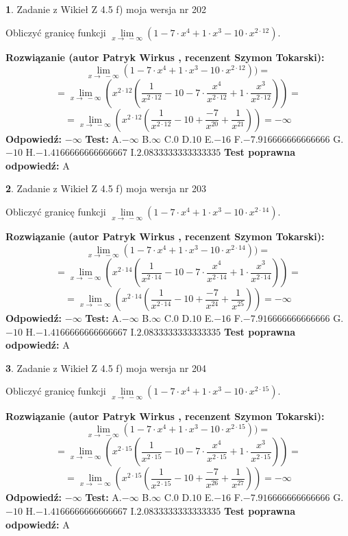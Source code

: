 \documentclass[12pt, a4paper]{article}
\theoremstyle{definition} %
\newtheorem{zad}{}
\newcommand{\zadStart}[1]{\begin{zad}#1\newline}
\newcommand{\zadStop}{\end{zad}}
\newcommand{\rozwStart}[2]{\noindent \textbf{Rozwiązanie (autor #1 , recenzent #2): }\newline}
\newcommand{\rozwStop}{\newline}
\newcommand{\odpStart}{\noindent \textbf{Odpowiedź:}\newline}
\newcommand{\odpStop}{\newline}
\newcommand{\testStart}{\noindent \textbf{Test:}\newline}
\newcommand{\testStop}{\newline}
\newcommand{\kluczStart}{\noindent \textbf{Test poprawna odpowiedź:}\newline}
\newcommand{\kluczStop}{\newline}
\begin{document}
\zadStart{Zadanie z Wikieł Z 4.5 f) moja wersja nr 202}


Obliczyć granicę funkcji  $\lim\limits_{x\to\ -\infty}(1 - 7 \cdot x^{4}+1 \cdot x^{3}- 10 \cdot x^{2\cdot12})$.
\zadStop
\rozwStart{Patryk Wirkus}{Szymon Tokarski}
$$\lim\limits_{x\to\ -\infty}(1 - 7 \cdot x^{4}+1 \cdot x^{3}- 10 \cdot x^{2\cdot12}))=$$
$$=\lim\limits_{x\to\ -\infty}(x^{2\cdot12}(\frac{1}{x^{2\cdot12}}-10 -7 \cdot \frac{x^{4}}{x^{2\cdot12}}+1 \cdot \frac{x^{3}}{x^{2\cdot12}}))=$$
$$=\lim\limits_{x\to\ -\infty}(x^{2\cdot12}(\frac{1}{x^{2\cdot12}}-10 + \frac{-7}{x^{20}}+ \frac{1}{x^{21}}))=-\infty$$
\rozwStop
\odpStart
$-\infty$
\odpStop
\testStart
A.$-\infty$ B.$\infty$ C.$0$ D.$10$ E.$-16$
F.$-7.916666666666666$ G.$-10$
H.$-1.4166666666666667$
I.$2.0833333333333335$
\testStop
\kluczStart
A
\kluczStop



\zadStart{Zadanie z Wikieł Z 4.5 f) moja wersja nr 203}


Obliczyć granicę funkcji  $\lim\limits_{x\to\ -\infty}(1 - 7 \cdot x^{4}+1 \cdot x^{3}- 10 \cdot x^{2\cdot14})$.
\zadStop
\rozwStart{Patryk Wirkus}{Szymon Tokarski}
$$\lim\limits_{x\to\ -\infty}(1 - 7 \cdot x^{4}+1 \cdot x^{3}- 10 \cdot x^{2\cdot14}))=$$
$$=\lim\limits_{x\to\ -\infty}(x^{2\cdot14}(\frac{1}{x^{2\cdot14}}-10 -7 \cdot \frac{x^{4}}{x^{2\cdot14}}+1 \cdot \frac{x^{3}}{x^{2\cdot14}}))=$$
$$=\lim\limits_{x\to\ -\infty}(x^{2\cdot14}(\frac{1}{x^{2\cdot14}}-10 + \frac{-7}{x^{24}}+ \frac{1}{x^{25}}))=-\infty$$
\rozwStop
\odpStart
$-\infty$
\odpStop
\testStart
A.$-\infty$ B.$\infty$ C.$0$ D.$10$ E.$-16$
F.$-7.916666666666666$ G.$-10$
H.$-1.4166666666666667$
I.$2.0833333333333335$
\testStop
\kluczStart
A
\kluczStop



\zadStart{Zadanie z Wikieł Z 4.5 f) moja wersja nr 204}


Obliczyć granicę funkcji  $\lim\limits_{x\to\ -\infty}(1 - 7 \cdot x^{4}+1 \cdot x^{3}- 10 \cdot x^{2\cdot15})$.
\zadStop
\rozwStart{Patryk Wirkus}{Szymon Tokarski}
$$\lim\limits_{x\to\ -\infty}(1 - 7 \cdot x^{4}+1 \cdot x^{3}- 10 \cdot x^{2\cdot15}))=$$
$$=\lim\limits_{x\to\ -\infty}(x^{2\cdot15}(\frac{1}{x^{2\cdot15}}-10 -7 \cdot \frac{x^{4}}{x^{2\cdot15}}+1 \cdot \frac{x^{3}}{x^{2\cdot15}}))=$$
$$=\lim\limits_{x\to\ -\infty}(x^{2\cdot15}(\frac{1}{x^{2\cdot15}}-10 + \frac{-7}{x^{26}}+ \frac{1}{x^{27}}))=-\infty$$
\rozwStop
\odpStart
$-\infty$
\odpStop
\testStart
A.$-\infty$ B.$\infty$ C.$0$ D.$10$ E.$-16$
F.$-7.916666666666666$ G.$-10$
H.$-1.4166666666666667$
I.$2.0833333333333335$
\testStop
\kluczStart
A
\kluczStop
\end{document}
